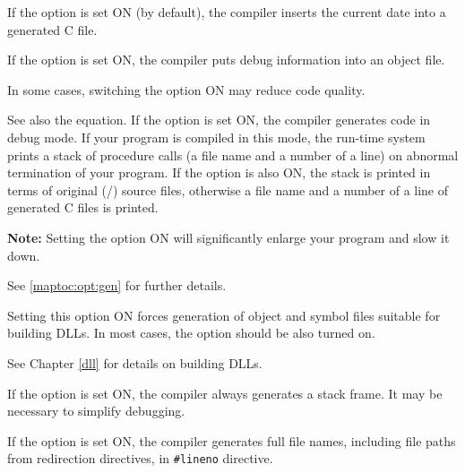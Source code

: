 \begin{description}
        If the option is set ON (by default), the compiler inserts
        the current date into a generated C file.
\fi

        \MLBegin{}\ModeC{}\MLEnd{} \header

\ifgencode
        If the option is set ON, the compiler puts
        debug information into an object file.

        In some cases, switching the option ON may reduce
        code quality.

        See also the  equation.
\fi
\ifgenc
        If the option is set ON, the compiler generates code in
        debug mode. If your program is compiled in this mode, the
        run-time system prints a stack of procedure calls (a file
        name and a number of a line) on abnormal termination of your
        program. If the option  is also ON, the stack
        is printed in terms of original (\ot{}/\mt{}) source files,
        otherwise a file name and a number of a line of generated C files
        is printed.

        {\bf Note:} Setting the option ON will significantly enlarge
        your program and slow it down.

        See \ref{maptoc:opt:gen} for further details.
\fi

\ifgencode
\ifdll
{}
        \MLBegin{}\ModeC{}\MLEnd{}

        Setting this option ON forces generation of object and symbol files
        suitable for building DLLs. In most cases, the  option
        should be also turned on.

        See Chapter \ref{dll} for details on building DLLs.
\fi

        \MLBegin{}\ModeC{}\MLEnd{} \header

        If the option is set ON, the compiler always generates a stack frame.
        It may be necessary to simplify debugging.
\fi

\ifgenc
{}
        \MLBegin{}\ModeC{}\MLEnd{}

        If the option is set ON, the compiler generates full file names,
        including file paths from redirection directives,
        in \verb'#lineno' directive.
\fi

        \MLBegin{}\ModeC{}\MLEnd{} \header


\end{description}
